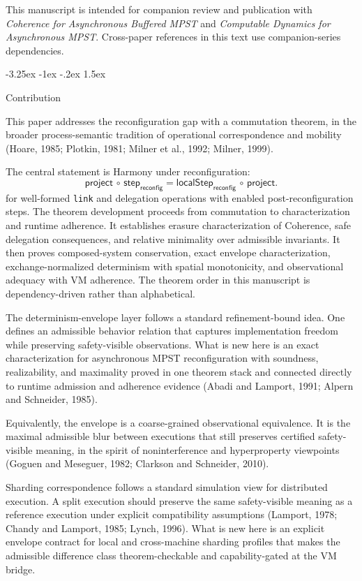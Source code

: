 \documentclass[a4paper,10pt,twocolumn,english]{article}
\makeatletter
\renewcommand{\subsection}{\@startsection{subsection}{2}{\z@}%
  {-3.25ex \@plus -1ex \@minus -.2ex}%
  {1.5ex}%
  {\raggedright\normalfont\normalsize\bfseries}}
\numberwithin{equation}{section}
\theoremstyle{paperdef}
\theoremstyle{paperplain}
\theoremstyle{paperdef}
\theoremstyle{paperremark}
\theoremstyle{paperdef}
\makeatother
\begin{document}
This manuscript is intended for companion review and publication with
\emph{Coherence for Asynchronous Buffered MPST} and
\emph{Computable Dynamics for Asynchronous MPST}. Cross-paper references in this
text use companion-series dependencies.

\subsection{Contribution}

This paper addresses the reconfiguration gap with a commutation theorem, in the broader process-semantic tradition of operational correspondence and mobility (Hoare, 1985; Plotkin, 1981; Milner et al., 1992; Milner, 1999).

The central statement is Harmony under reconfiguration:
\begin{equation}
	\mathsf{project}\,\circ\,\mathsf{step}_{\mathsf{reconfig}}
	=
	\mathsf{localStep}_{\mathsf{reconfig}}\,\circ\,\mathsf{project}.
\end{equation}
for well-formed \texttt{link} and delegation operations with enabled post-reconfiguration steps. The
theorem development proceeds from commutation to characterization and runtime adherence. It
establishes erasure characterization of Coherence, safe delegation consequences, and relative minimality
over admissible invariants. It then proves composed-system conservation, exact envelope
characterization, exchange-normalized determinism with spatial monotonicity, and observational adequacy
with VM adherence.
The theorem order in this manuscript is dependency-driven rather than alphabetical.

The determinism-envelope layer follows a standard refinement-bound idea. One defines an admissible
behavior relation that captures implementation freedom while preserving safety-visible observations.
What is new here is an exact characterization for asynchronous MPST reconfiguration with soundness,
realizability, and maximality proved in one theorem stack and connected directly to runtime admission
and adherence evidence (Abadi and Lamport, 1991; Alpern and Schneider, 1985).

Equivalently, the envelope is a coarse-grained observational equivalence. It is the maximal admissible
blur between executions that still preserves certified safety-visible meaning, in the spirit of
noninterference and hyperproperty viewpoints (Goguen and Meseguer, 1982; Clarkson and Schneider, 2010).

Sharding correspondence follows a standard simulation view for distributed execution. A split execution
should preserve the same safety-visible meaning as a reference execution under explicit compatibility
assumptions (Lamport, 1978; Chandy and Lamport, 1985; Lynch, 1996). What is new here is an explicit
envelope contract for local and cross-machine sharding profiles that makes the admissible difference
class theorem-checkable and capability-gated at the VM bridge.
\end{document}

